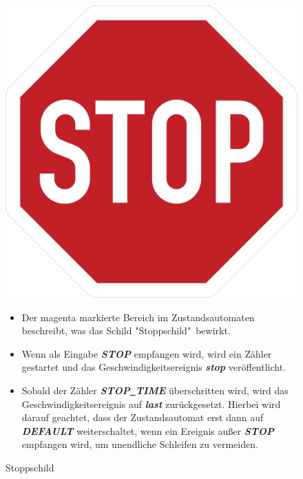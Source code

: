 \begin{figure}[h]
\begin{minipage}[t]{4cm}
\vspace{0pt}
\centering
\includegraphics[scale=0.04]{images/STOP.jpg}
\caption{Stoppschild}
\label{fig:PED}
\end{minipage}
\hfill
\begin{minipage}[t]{10cm}
\vspace{0pt}
\begin{itemize}
\item Der magenta markierte Bereich im Zustandsautomaten beschreibt, was das Schild "Stoppschild"\ bewirkt.

\item Wenn als Eingabe \textbf{\textit{STOP}} empfangen wird, wird ein Z\"ahler gestartet und das Geschwindigkeitsereignis \textbf{\textit{stop}} ver\"offentlicht.

\item Sobald der Z\"ahler \textbf{\textit{STOP\underline{\ }TIME}} \"uberschritten wird, wird das Geschwindigkeitsereignis auf \textbf{\textit{last}} zur\"uckgesetzt. Hierbei wird darauf geachtet, dass der Zustandsautomat erst dann auf \textbf{\textit{DEFAULT}} weiterschaltet, wenn ein Ereignis au\ss{}er \textbf{\textit{STOP}} empfangen wird, um unendliche Schleifen zu vermeiden.
\end{itemize}
\end{minipage}
\end{figure}


